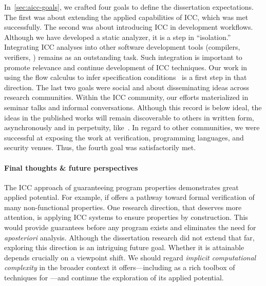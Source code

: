 In~\autoref{sec:aicc-goals}, we crafted four goals to define the dissertation
expectations. The first was about extending the applied capabilities of ICC,
which was met successfully. The second was about introducing ICC in development
workflows. Although we have developed a static analyzer, it is a step in
\enquote{isolation.} Integrating ICC analyses into other software development
tools (compilers, verifiers, \etc) remains as an outstanding task. Such
integration is important to promote relevance and continue development of ICC
techniques. Our work in using the flow calculus to infer
specification conditions~\cite{rusch2025} is a first step
in that direction. The last two goals were social and about disseminating ideas
across research communities. Within the ICC community, our efforts materialized
in seminar talks and informal conversations. Although this record is below
ideal, the ideas in the published works will remain discoverable to others in
written form, asynchronously and in perpetuity, like~\cite{moyen2017}. In regard
to other communities, we were successful at exposing the work at verification,
programming languages, and security venues. Thus, the fourth goal was
satisfactorily met.

\paragraph*{Final thoughts \& future perspectives} The ICC approach of
guaranteeing program properties demonstrates great applied potential. For
example, if offers a pathway toward formal verification of many non-functional
properties. One research direction, that deserves
more attention, is applying ICC systems to ensure properties by construction.
This would provide guarantees before any program exists and eliminates the need
for \emph{aposteriori} analysis. Although the dissertation research did not
extend that far, exploring this direction is an intriguing future goal. Whether
it is attainable depends crucially on a viewpoint shift. We should regard
\emph{implicit computational complexity} in the broader context it
offers---including as a rich toolbox of techniques for ---and continue the exploration of its applied potential.
